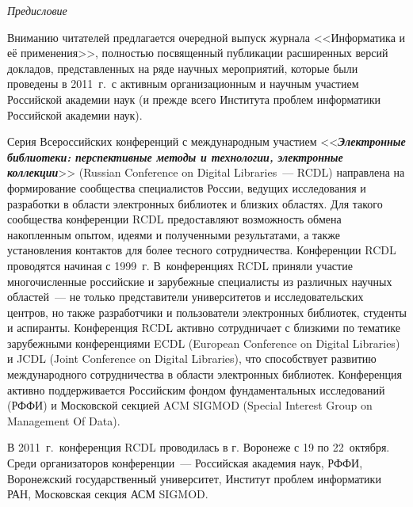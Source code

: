    { %
   { %
   
   \vspace*{-48pt}
   \begin{center}\LARGE
   \textit{Предисловие}
   \end{center}
   
   
   \vspace*{25mm}
   
   \thispagestyle{empty}
   
   { %


     
     Вниманию читателей предлагается очередной выпуск журнала <<Информатика и её 
применения>>, полностью посвященный публикации расширенных версий докладов, 
представленных на ряде научных мероприятий, которые были проведены в 2011~г.\ с 
активным организационным и научным участием Российской академии наук (и прежде 
всего Института проблем информатики Российской академии наук). 
     
     \smallskip
     
     Серия Всероссийских конференций с международным участием 
<<{\bfseries\textit{Электронные библиотеки: перспективные методы и технологии, 
электронные коллекции}}>> (Russian Conference on Digital Libraries~--- RCDL) направлена 
на формирование сообщества специалистов России, ведущих исследования и разработки в 
области электронных библиотек и близких областях. Для такого сообщества конференции 
RCDL пред\-остав\-ля\-ют возможность обмена накопленным опытом, идеями и полученными 
результатами, а также установления контактов для более тесного сотрудничества. 
Конференции RCDL проводятся начиная с 1999~г. В~конференциях RCDL приняли 
участие многочисленные российские и зарубежные специалисты из различных научных 
областей~--- не только представители университетов и исследовательских центров, но 
также разработчики и пользователи электронных библиотек, студенты и аспиранты. 
Конференция RCDL активно сотрудничает с близкими по тематике зарубежными конференциями 
ECDL (European Conference on Digital Libraries)
и JCDL (Joint Conference on Digital Libraries), что способствует 
развитию международного сотрудничества в области 
электронных библиотек. Конференция активно поддерживается Российским фондом фундаментальных
исследований (РФФИ) и Московской  секцией ACM SIGMOD (Special Interest Group on
Management Of Data).
     
     В 2011~г.\ конференция RCDL проводилась в г. Воронеже с 19 по 22~октября. 
Среди организаторов конференции~--- Российская академия наук, РФФИ, Воронежский государственный университет, Институт 
проблем информатики РАН, Московская секция АСМ SIGMOD. 
     
}}}
